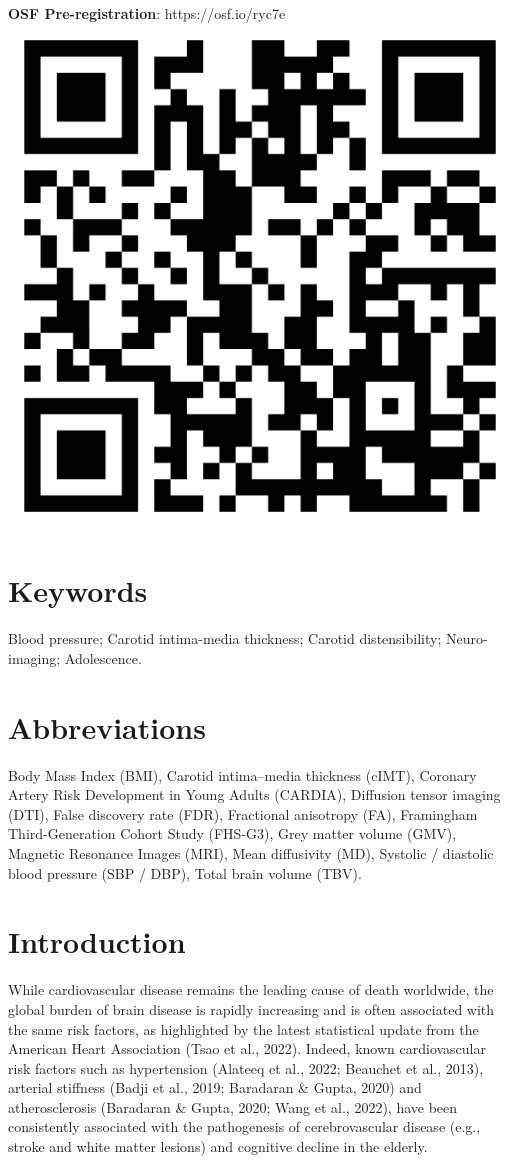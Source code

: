 \documentclass[
  letterpaper,
  DIV=11,
  numbers=noendperiod]{scrreport}
\begin{document}
\textbf{OSF Pre-registration}: https://osf.io/ryc7e\newline
\includegraphics[width=0.2\linewidth,height=\textheight,keepaspectratio]{7.Chapter/../img/qrcode_els_repo.png}

\section*{Keywords}\label{keywords-3}


Blood pressure; Carotid intima-media thickness; Carotid distensibility;
Neuro-imaging; Adolescence.

\section*{Abbreviations}\label{abbreviations-3}


Body Mass Index (BMI), Carotid intima--media thickness (cIMT), Coronary
Artery Risk Development in Young Adults (CARDIA), Diffusion tensor
imaging (DTI), False discovery rate (FDR), Fractional anisotropy (FA),
Framingham Third-Generation Cohort Study (FHS-G3), Grey matter volume
(GMV), Magnetic Resonance Images (MRI), Mean diffusivity (MD), Systolic
/ diastolic blood pressure (SBP / DBP), Total brain volume (TBV).

\newpage

\section{Introduction}\label{introduction-5}

While cardiovascular disease remains the leading cause of death
worldwide, the global burden of brain disease is rapidly increasing and
is often associated with the same risk factors, as highlighted by the
latest statistical update from the American Heart Association (Tsao et
al., 2022). Indeed, known cardiovascular risk factors such as
hypertension (Alateeq et al., 2022; Beauchet et al., 2013), arterial
stiffness (Badji et al., 2019; Baradaran \& Gupta, 2020) and
atherosclerosis (Baradaran \& Gupta, 2020; Wang et al., 2022), have been
consistently associated with the pathogenesis of cerebrovascular disease
(e.g., stroke and white matter lesions) and cognitive decline in the
elderly.
\end{document}
